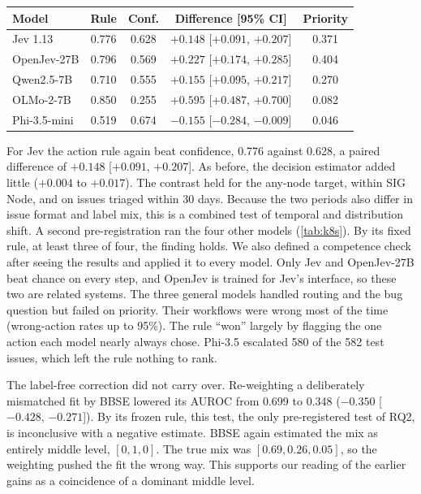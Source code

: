 \begin{coltable}
\centering
\caption{Kubernetes test set (582 issues). Columns give the AUROC of the
action-rule score and of final-step confidence for wrong actions, and
their paired difference (95\% CI). Priority is test-set priority accuracy
(chance 0.33). Jev's row is from the first pre-registration and the other
four from the second.}
\label{tab:k8s}
\footnotesize
\setlength{\tabcolsep}{3pt}
\begin{tabular}{lcccc}
\toprule
Model & Rule & Conf. & Difference [95\% CI] & Priority \\
\midrule
Jev 1.13     & 0.776 & 0.628 & $+0.148$ [$+0.091$, $+0.207$] & 0.371 \\
\midrule
OpenJev-27B  & 0.796 & 0.569 & $+0.227$ [$+0.174$, $+0.285$] & 0.404 \\
Qwen2.5-7B   & 0.710 & 0.555 & $+0.155$ [$+0.095$, $+0.217$] & 0.270 \\
OLMo-2-7B    & 0.850 & 0.255 & $+0.595$ [$+0.487$, $+0.700$] & 0.082 \\
Phi-3.5-mini & 0.519 & 0.674 & $-0.155$ [$-0.284$, $-0.009$] & 0.046 \\
\bottomrule
\end{tabular}
\end{coltable}

For Jev the action rule again beat confidence, 0.776 against 0.628, a
paired difference of $+0.148$ [$+0.091$, $+0.207$]. As before, the
decision estimator added little ($+0.004$ to $+0.017$). The contrast held for the any-node target, within SIG Node, and on issues triaged
within 30 days. Because the two periods also differ in issue format and
label mix, this is a combined test of temporal and distribution shift. A second
pre-registration ran the four other models (\cref{tab:k8s}). By its fixed rule, at least three of four, the finding holds. We also
defined a competence check after seeing the results and
applied it to every model. Only Jev and OpenJev-27B beat chance on every
step, and OpenJev is trained for Jev's interface, so these two are
related systems. The three
general models handled routing and the bug question but failed on priority. Their
workflows were wrong most of the time (wrong-action rates up to 95\%).
The rule ``won'' largely by flagging the one
action each model nearly always chose. Phi-3.5 escalated 580 of the 582
test issues, which left the rule nothing to rank.

The label-free correction did not carry over. Re-weighting a deliberately
mismatched fit by BBSE lowered its AUROC from 0.699 to 0.348
($-0.350$ [$-0.428$, $-0.271$]). By its frozen rule, this test, the only
pre-registered test of RQ2, is inconclusive with a negative estimate. BBSE again
estimated the mix as entirely middle level, $[0, 1, 0]$. The true mix was
$[0.69, 0.26, 0.05]$, so the weighting pushed the fit the wrong
way. This supports our reading of the earlier gains as a coincidence of
a dominant middle level.

